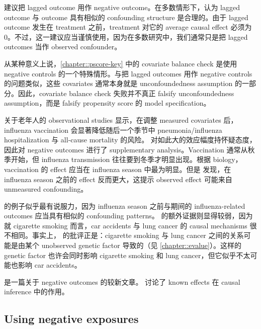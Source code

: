 \begin{example}
\citet{imbens2015causal} 建议把 lagged outcome 用作 negative outcome。在多数情形下，认为 lagged outcome 与 outcome 具有相似的 confounding structure 是合理的。由于 lagged outcome 发生在 treatment 之前，treatment 对它的 average causal effect 必须为 $0$。不过，这一建议应当谨慎使用，因为在多数研究中，我们通常只是把 lagged outcomes 当作 observed confounder。

从某种意义上说，\cref{chapter::pscore-key} 中的 covariate balance check 是使用 negative controls 的一个特殊情形。与把 lagged outcomes 用作 negative controls 的问题类似，这些 covariates 通常本身就是 unconfoundedness assumption 的一部分。因此，covariate balance check 失败并不真正 falsify unconfoundedness assumption，而是 falsify propensity score 的 model specification。
\end{example}

\begin{example}
关于老年人的 observational studies 显示，在调整 measured covariates 后，influenza vaccination 会显著降低随后一个季节中 pneumonia/influenza hospitalization 与 all-cause mortality 的风险。\citet{jackson2006evidence} 对如此大的效应幅度持怀疑态度，因此对 negative outcomes 进行了 supplementary analysis。Vaccination 通常从秋季开始，但 influenza transmission 往往要到冬季才明显出现。根据 biology，vaccination 的 effect 应当在 influenza season 中最为明显。但是 \citet{jackson2006evidence} 发现，在 influenza season 之前的 effect 反而更大，这提示 observed effect 可能来自 unmeasured confounding。
\end{example}

\citet{jackson2006evidence} 的例子似乎最有说服力，因为 influenza season 之前与期间的 influenza-related outcomes 应当具有相似的 confounding patterns。\citet{Cornfield::1959} 的额外证据则显得较弱，因为就 cigarette smoking 而言，car accidents 与 lung cancer 的 causal mechanisms 很不相同。事实上，\citet{Fisher::1957} 的批评正是：cigarette smoking 与 lung cancer 之间的关系可能是由某个 unobserved genetic factor 导致的（见 \cref{chapter::evalue}）。这样的 genetic factor 也许会同时影响 cigarette smoking 和 lung cancer，但它似乎不太可能也影响 car accidents。


\citet{lipsitch2010negative} 是一篇关于 negative outcomes 的较新文章。
\citet{rosenbaum1989role} 讨论了 known effects 在 causal inference 中的作用。

 

\subsection{Using negative exposures}

